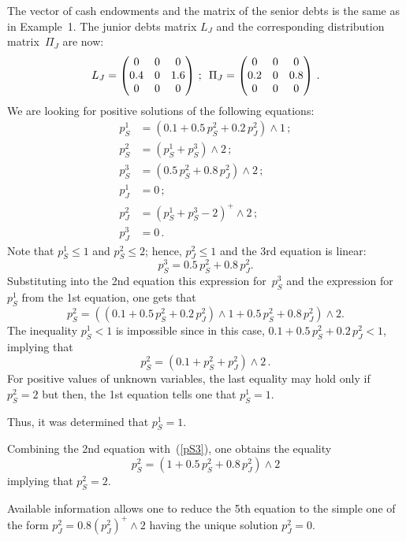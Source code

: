 \begin{multicols}{2}
\noindent
The vector of cash endowments and the matrix of the senior debts  is the same as 
in Example~1. The junior debts matrix $L_J$ and the corresponding 
distribution matrix~$\Pi_J$ are now:
$$
L_J=\begin{pmatrix}
0 & 0 & 0\\
0.4& 0 & 1.6\\
0 & 0 & 0
\end{pmatrix}\,;
 \enskip
\Pi_J=\begin{pmatrix}
0 & 0 & 0\\
0.2& 0 & 0.8\\
0 & 0 & 0
\end{pmatrix}\,.
$$
We are looking for positive solutions of the following  equations:
\begin{align*}
p_S^1 & =  \left(0.1+0.5\, p_S^2 + 0.2\, p_J^2\right)\wedge 1\,;\\
p_S^2 & =  \left(p_S^1+p_S^3 \right)\wedge 2\,;\\
p_S^3 & =  \left(0.5\, p_S^2+0.8\, p_J^2\right)\wedge 2\,;\\
p_J^1 & = 0\,;\\
p_J^2 & = \left(p_S^1+p_S^3-2\right)^+\wedge 2\,;\\
p_J^3 & = 0\,.
\end{align*}
Note that $p_S^1\le 1$ and $p_S^2\le 2$; hence, $p_J^2\le 1$ and the 3rd equation 
is linear:
\begin{equation}
\label{pS3}
p_S^3  =  0.5\, p_S^2+0.8\, p_J^2.
\end{equation}
Substituting into the 2nd equation this expression for~$p_S^3$ and the 
expression for~$p_S^1$ from the 1st equation, one gets that
\begin{equation*}
p_S^2 \!=\!\left(\!\left(0.1+0.5\, p_S^2 + 0.2\, p_J^2\right)\wedge 1+
0.5\, p_S^2+0.8\, p_J^2 \right)\wedge 2.
\end{equation*}
The inequality $p_S^1< 1$ is impossible since in this case, $0.1+0.5\, p_S^2 + 
0.2\, p_J^2<1$, implying that
$$
p_S^2 =\left(0.1+p_S^2 + p_J^2\right)\wedge 2\,.
$$
For positive values of unknown variables, the last equality may hold only if  
$p_S^2=2$ but then, the 1st equation tells one that  $p_S^1=1$.

Thus, it was determined that $p_S^1=1$.

Combining the 2nd equation with~(\ref{pS3}), one obtains the equality
$$
p_S^2  =  \left(1+0.5\, p_S^2+0.8\, p_J^2\right)\wedge 2
$$
implying that $p_S^2=2$.

Available information allows one to reduce
the 5th equation to the simple one of the  form
$p_J^2  = 0.8\left(p_J^2\right)^+\wedge 2$ having the unique solution  $p_J^2=0$.


\end{multicols}
